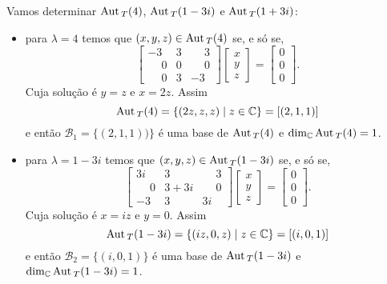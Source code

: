 \begin{exemplo}
\begin{enumerate}[label={\arabic*})]
\begin{solucao}
                Vamos determinar ${\rm Aut\,}_T(4)$, ${\rm Aut\,}_T(1 - 3i)$ e ${\rm Aut\,}_T(1 + 3i)$:
                \begin{itemize}
                    \item para $\lambda = 4$ temos que $(x,y,z) \in {\rm Aut\,}_T(4)$ se, e s\'o se,
                    \[
                        \begin{bmatrix}-3 & 3 & \phantom{-}3\\\phantom{-}0 & 0 & \phantom{-}0\\\phantom{-}0 & 3 & -3\end{bmatrix}
                        \begin{bmatrix}x\\y\\z\end{bmatrix} = \begin{bmatrix}0\\0\\0\end{bmatrix}.
                    \]
                    Cuja solu\c{c}ão é $y = z$ e $x = 2z$. Assim
                    \[
                        {\rm Aut\,}_T(4) = \{(2z,z,z) \mid z \in \mathbb{C}\} = [(2,1,1)]
                    \]
                e ent\~ao $\mathcal{B}_1 = \{(2,1,1))\}$ \'e uma base de ${\rm Aut\,}_T(4)$ e $\dim_{\mathbb{C}}{\rm Aut\,}_T(4) = 1$.

                \item para $\lambda = 1 - 3i$ temos que $(x,y,z) \in {\rm Aut\,}_T(1 - 3i)$ se, e s\'o se,
                \[
                    \begin{bmatrix}
                        3i & 3 & \phantom{-}3\\
                        \phantom{-}0 & 3 + 3i & \phantom{-}0\\
                        -3 & 3 & 3i
                    \end{bmatrix}\begin{bmatrix}
                        x\\y\\z
                    \end{bmatrix} = \begin{bmatrix}
                        0\\0\\0
                    \end{bmatrix}.
                \]
                Cuja solu\c{c}ão é $x = iz$ e $y = 0$. Assim
                \[
                    {\rm Aut\,}_T(1 - 3i) = \{(iz,0,z) \mid z \in \mathbb{C}\} = [(i,0,1)]
                \]
                e ent\~ao $\mathcal{B}_2 = \{(i,0,1)\}$ \'e uma base de ${\rm Aut\,}_T(1 - 3i)$ e $\dim_{\mathbb{C}}{\rm Aut\,}_T(1 - 3i) = 1$.


\end{itemize}
\end{solucao}
\end{enumerate}
\end{exemplo}
